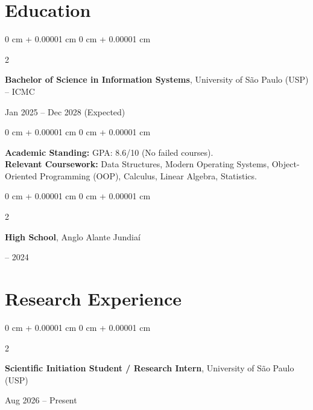 \documentclass[10pt, letterpaper]{article}
\newenvironment{onecolentry}{
    \begin{adjustwidth}{
        0 cm + 0.00001 cm
    }{
        0 cm + 0.00001 cm
    }
}{
    \end{adjustwidth}
} %
\newenvironment{twocolentry}[2][]{
    \onecolentry
    \def\secondColumn{#2}
    \setcolumnwidth{\fill, 4.5 cm}
    \begin{paracol}{2}
}{
    \switchcolumn \raggedleft \secondColumn
    \end{paracol}
    \endonecolentry
} %
\begin{document}
\section{Education}

\begin{twocolentry}{
    Jan 2025 – Dec 2028 (Expected)
}
    \textbf{Bachelor of Science in Information Systems}, University of São Paulo (USP) -- ICMC
\end{twocolentry}

\vspace{0.10 cm}
\begin{onecolentry}
    \footnotesize\textbf{Academic Standing:} GPA: 8.6/10 (No failed courses). \\
    \textbf{Relevant Coursework:} Data Structures, Modern Operating Systems, Object-Oriented Programming (OOP), Calculus, Linear Algebra, Statistics.
\end{onecolentry}

\vspace{0.20 cm}

\begin{twocolentry}{
    2022 – 2024
}
    \textbf{High School}, Anglo Alante Jundiaí
\end{twocolentry}

\vspace{0.15cm}

\section{Research Experience}
        
\begin{twocolentry}{
    Aug 2026 – Present
}
    \textbf{Scientific Initiation Student / Research Intern}, University of São Paulo (USP)
\end{twocolentry}
\end{document}
